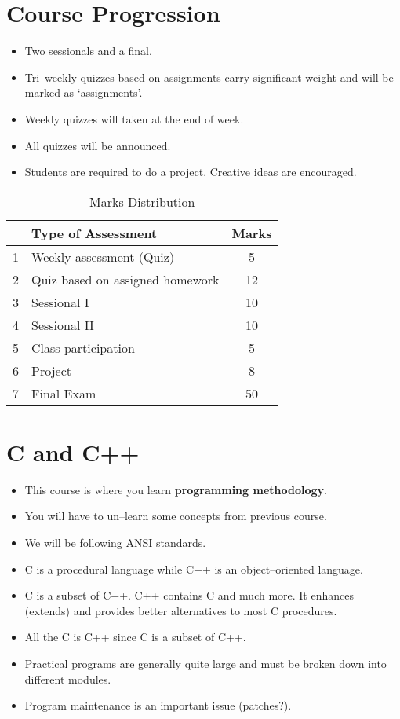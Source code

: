 \documentclass[12pt,a4paper]{article}
\begin{document}
\section{Course Progression}
\begin{itemize}
\item Two sessionals and a final.
\item Tri--weekly quizzes based on assignments carry significant weight and will be marked as `assignments'.
\item Weekly quizzes will taken at the end of week.
\item All quizzes will be announced.
\item Students are required to do a project. Creative ideas are encouraged.
\end{itemize}
\begin{table}[H]
\begin{center}
\vspace{0.3cm}
	\begin{tabular}{llc}
	\hline \hline
		\rule{0pt}{2.6ex} & \textbf{Type of Assessment} & \textbf{Marks}\\
		\hline
		1 \rule{0pt}{2.6ex} & Weekly assessment (Quiz) & 5\\
		2 & Quiz based on assigned homework& 12\\
		3 & Sessional I & 10\\
		4 & Sessional II & 10\\
		5 & Class participation & 5\\
		6 & Project & 8\\
		7 & Final Exam & 50\\
	\hline \hline
	\end{tabular}
\end{center}
\label{Marks Distribution}
\caption{Marks Distribution}
\end{table}
\section{C and C++}
\begin{itemize}
\item This course is where you learn \textbf{programming methodology}.
\item You will have to un--learn some concepts from previous course.
\item We will be following ANSI standards.
\item C is a procedural language while C++ is an object--oriented language.
\item C is a subset of C++. C++ contains C and much more. It enhances (extends) and provides better alternatives to most C procedures.
\item All the C is C++ since C is a subset of C++.
\item Practical programs are generally quite large and must be broken down into different modules.
\item Program maintenance is an important issue (patches?).
\end{itemize}
\end{document}
